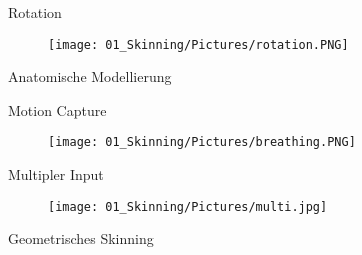 {
	
	\begin{frame}{\Huge{Rotation}}
		
		\begin{figure}
			\texttt{[image: 01\_Skinning/Pictures/rotation.PNG]}
		\end{figure}
		
		
		
	\end{frame}
}

{ %
	\begin{frame}{\Huge{Anatomische Modellierung}}
		
		
		
		
	\end{frame}
} %

{
	
	\begin{frame}{\Huge{Motion Capture}}
		
		\begin{figure}
			\texttt{[image: 01\_Skinning/Pictures/breathing.PNG]}
		\end{figure}
		
		
		
	\end{frame}
}

	\begin{frame}{\Huge{Multipler Input}}

		
		\begin{figure}
			\texttt{[image: 01\_Skinning/Pictures/multi.jpg]}
		\end{figure}
		
		
		
	\end{frame}


{ %
	\begin{frame}{\colorbox{black!10}{\Huge{Geometrisches Skinning}}}
		
		
		
		
	\end{frame}
} %
